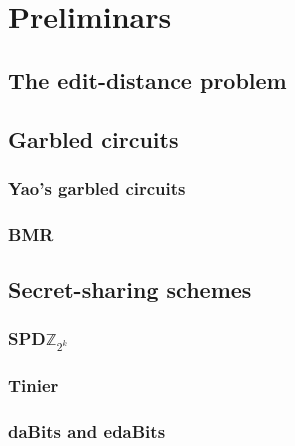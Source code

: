 \chapter{Preliminars}
\label{sec:preliminars}

\section{The edit-distance problem}
\label{sec:edit_distance}

\section{Garbled circuits}
\label{sec:garbled_circuits}

\subsection{Yao's garbled circuits}
\label{sec:yao}

\subsection{BMR}
\label{sec:bmr}

\section{Secret-sharing schemes}
\label{sec:secret_sharing}

\subsection{SPD$\mathbb{Z}_{2^k}$}
\label{sec:spdz2k}

\subsection{Tinier}
\label{sec:tinier}

\subsection{daBits and edaBits}
\label{sec:dabits_edabits}

